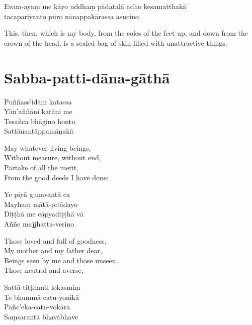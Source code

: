 Evam-ayaṃ me kāyo uddhaṃ pādatalā adho kesamatthakā\\
tacapariyanto pūro nānappakārassa asucino

\begin{english}
  This, then, which is my body, from the soles of the feet up, and down from the crown of the head, is a sealed bag of skin filled with unattractive things. 
\end{english}

\section{Sabba-patti-dāna-gāthā}



\begin{leader}
\end{leader}

Puññass'idāni katassa\\
Yān'aññāni katāni me\\
Tesañca bhāgino hontu\\
Sattānantāppamāṇakā

\begin{english}
  May whatever living beings,\\
  Without measure, without end,\\
  Partake of all the merit,\\
  From the good deeds I have done:
\end{english}

Ye piyā guṇavantā ca\\
Mayhaṃ mātā-pitādayo\\
Diṭṭhā me cāpyadiṭṭhā vā\\
Aññe majjhatta-verino

\begin{english}
  Those loved and full of goodness,\\
  My mother and my father dear,\\
  Beings seen by me and those unseen,\\
  Those neutral and averse,
\end{english}

Sattā tiṭṭhanti lokasmiṃ\\
Te bhummā catu-yonikā\\
Pañc'eka-catu-vokārā\\
Saṃsarantā bhavābhave


